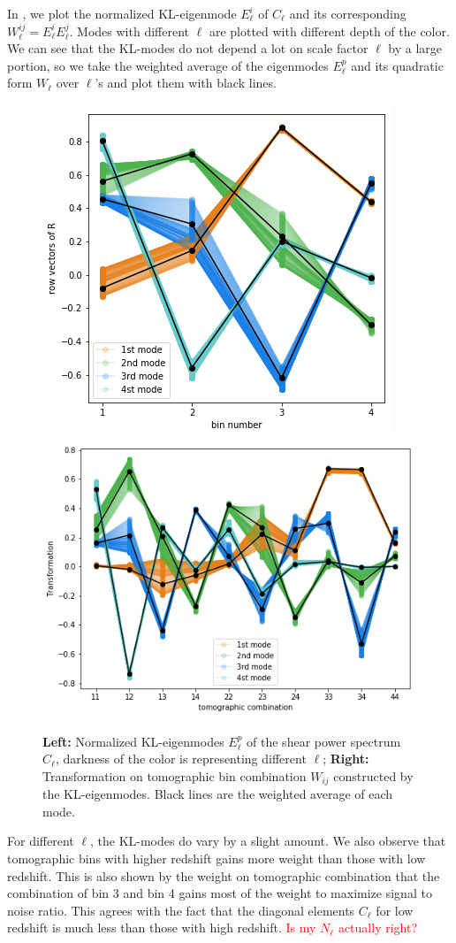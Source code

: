 \documentclass[twocolumn]{\docclass}
\begin{document}
	In , we plot the normalized KL-eigenmode $E_\ell^i$ of $C_{\ell}$ and its corresponding $W^{ij}_\ell=E_\ell^i E_\ell^j$. Modes with different $\ell$ are plotted with different depth of the color. We can see that the KL-modes do not depend a lot on scale factor $\ell$ by a large portion, so we take the weighted average of the eigenmodes $E_\ell^p$ and its quadratic form $W_\ell$ over $\ell$'s and plot them with black lines. 
	
	\begin{figure}
		\includegraphics[width=0.42\columnwidth]{epi.png}
		\includegraphics[width=0.53\columnwidth]{Wij.png}
		\caption{\textbf{Left:} Normalized KL-eigenmodes $E_\ell^p$ of the shear power spectrum $C_{\ell}$, darkness of the color is representing different $\ell$; \textbf{Right:} Transformation on tomographic bin combination $W_{ij}$ constructed by the KL-eigenmodes. Black lines are the weighted average of each mode. \label{fig:kl-mode}}
	\end{figure}
	
	For different $\ell$, the KL-modes do vary by a slight amount. We also observe that tomographic bins with higher redshift gains more weight than those with low redshift. This is also shown by the weight on tomographic combination that the combination of bin 3 and bin 4 gains most of the weight to maximize signal to noise ratio. This agrees with the fact that the diagonal elements $C_\ell$ for low redshift is much less than those with high redshift. \textcolor{red}{Is my $N_\ell$ actually right?}
	
\end{document}
